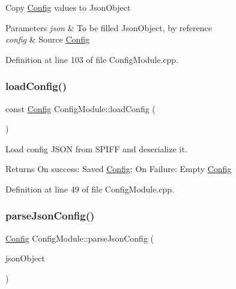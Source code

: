Copy \mbox{\hyperlink{struct_config}{Config}} values to Json\+Object 
\begin{DoxyParams}{Parameters}
{\em json} & To be filled Json\+Object, by reference \\
\hline
{\em config} & Source \mbox{\hyperlink{struct_config}{Config}} \\
\hline
\end{DoxyParams}


Definition at line 103 of file Config\+Module.\+cpp.

\mbox{\label{class_config_module_a1a9cda5559839cac0f4444d6352e9067}} 
\subsubsection{\texorpdfstring{loadConfig()}{loadConfig()}}
{\footnotesize\ttfamily const \mbox{\hyperlink{struct_config}{Config}} Config\+Module\+::load\+Config (\begin{DoxyParamCaption}{ }\end{DoxyParamCaption})}

Load config J\+S\+ON from S\+P\+I\+FF and deserialize it. \begin{DoxyReturn}{Returns}
On success\+: Saved \mbox{\hyperlink{struct_config}{Config}}; On Failure\+: Empty \mbox{\hyperlink{struct_config}{Config}} 
\end{DoxyReturn}


Definition at line 49 of file Config\+Module.\+cpp.

\mbox{\label{class_config_module_a937d05a9dd8761526d35b648d5823030}} 
\subsubsection{\texorpdfstring{parseJsonConfig()}{parseJsonConfig()}}
{\footnotesize\ttfamily \mbox{\hyperlink{struct_config}{Config}} Config\+Module\+::parse\+Json\+Config (\begin{DoxyParamCaption}\item[{const Json\+Object \&}]{json\+Object }\end{DoxyParamCaption})\hspace{0.3cm}{\ttfamily [private]}}

